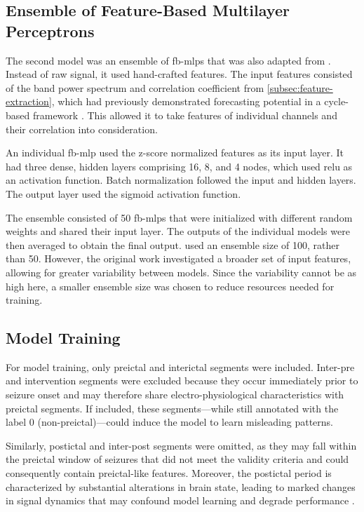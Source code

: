 \subsection{Ensemble of Feature-Based Multilayer Perceptrons}\label{subsec:ensemble-architecture}
The second model was an ensemble of \glspl{fb-mlp} that was also adapted from \textcite{muller_coherent_2022}.
Instead of raw signal, it used hand-crafted features.
The input features consisted of the band power spectrum and correlation coefficient from \cref{subsec:feature-extraction}, which had previously demonstrated forecasting potential in a cycle-based framework \parencite{yang_seizure_2024}.
This allowed it to take features of individual channels and their correlation into consideration.

An individual \gls{fb-mlp} used the z-score normalized features as its input layer.
It had three dense, hidden layers comprising 16, 8, and 4 nodes, which used \gls{relu} as an activation function.
Batch normalization followed the input and hidden layers.
The output layer used the sigmoid activation function.

The ensemble consisted of 50 \glspl{fb-mlp} that were initialized with different random weights and shared their input layer.
The outputs of the individual models were then averaged to obtain the final output.
\Textcite{muller_coherent_2022} used an ensemble size of 100, rather than 50.
However, the original work investigated a broader set of input features, allowing for greater variability between models. 
Since the variability cannot be as high here, a smaller ensemble size was chosen to reduce resources needed for training.

\subsection{Model Training} \label{subsec:model-training}
For model training, only preictal and interictal segments were included. 
Inter-pre and intervention segments were excluded because they occur immediately prior to seizure onset and may therefore share electro-physiological characteristics with preictal segments. 
If included, these segments—while still annotated with the label 0 (non-preictal)—could induce the model to learn misleading patterns.

Similarly, postictal and inter-post segments were omitted, as they may fall within the preictal window of seizures that did not meet the validity criteria and could consequently contain preictal-like features. 
Moreover, the postictal period is characterized by substantial alterations in brain state, leading to marked changes in signal dynamics that may confound model learning and degrade performance \parencite{muller_coherent_2022}.

